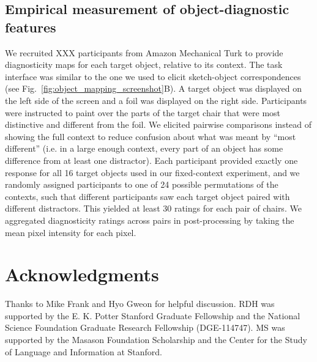 \documentclass[11pt,letterpaper]{article}
\begin{document}
\subsection{Empirical measurement of object-diagnostic features}

We recruited XXX participants from Amazon Mechanical Turk to provide diagnosticity maps for each target object, relative to its context.
The task interface was similar to the one we used to elicit sketch-object correspondences  (see Fig.~\ref{fig:object_mapping_screenshot}B).
A target object was displayed on the left side of the screen and a foil was displayed on the right side. 
Participants were instructed to paint over the parts of the target chair that were most distinctive and different from the foil.
We elicited pairwise comparisons instead of showing the full context to reduce confusion about what was meant by ``most different'' (i.e. in a large enough context, every part of an object has some difference from at least one distractor). 
Each participant provided exactly one response for all 16 target objects used in our fixed-context experiment, and we randomly assigned participants to one of 24 possible permutations of the contexts, such that different participants saw each target object paired with different distractors. 
This yielded at least 30 ratings for each pair of chairs. 
We aggregated diagnosticity ratings across pairs in post-processing by taking the mean pixel intensity for each pixel.

\section{\bf Acknowledgments}
\small
Thanks to Mike Frank and Hyo Gweon for helpful discussion.
RDH was supported by the E. K. Potter Stanford Graduate Fellowship and the National Science Foundation Graduate Research Fellowship (DGE-114747).
MS was supported by the Masason Foundation Scholarship and the Center for the Study of Language and Information at Stanford. 
\end{document}
